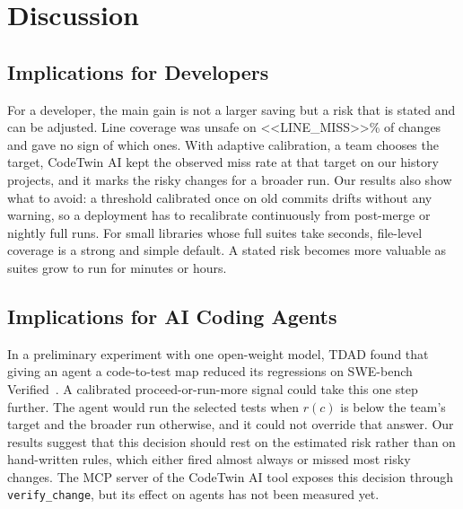 \documentclass[conference]{IEEEtran}
\begin{document}
\section{Discussion}\label{sec:discussion}
\subsection{Implications for Developers}
For a developer, the main gain is not a larger saving but a risk that is stated and can be adjusted. Line coverage was unsafe on <<LINE_MISS>>\% of changes and gave no sign of which ones. With adaptive calibration, a team chooses the target, CodeTwin AI kept the observed miss rate at that target on our history projects, and it marks the risky changes for a broader run. Our results also show what to avoid: a threshold calibrated once on old commits drifts without any warning, so a deployment has to recalibrate continuously from post-merge or nightly full runs. For small libraries whose full suites take seconds, file-level coverage is a strong and simple default. A stated risk becomes more valuable as suites grow to run for minutes or hours.

\subsection{Implications for AI Coding Agents}
In a preliminary experiment with one open-weight model, TDAD found that giving an agent a code-to-test map reduced its regressions on SWE-bench Verified~\cite{alonso2026tdad}. A calibrated proceed-or-run-more signal could take this one step further. The agent would run the selected tests when $r(c)$ is below the team's target and the broader run otherwise, and it could not override that answer. Our results suggest that this decision should rest on the estimated risk rather than on hand-written rules, which either fired almost always or missed most risky changes. The MCP server of the CodeTwin AI tool exposes this decision through \texttt{verify\_change}, but its effect on agents has not been measured yet.
\end{document}
